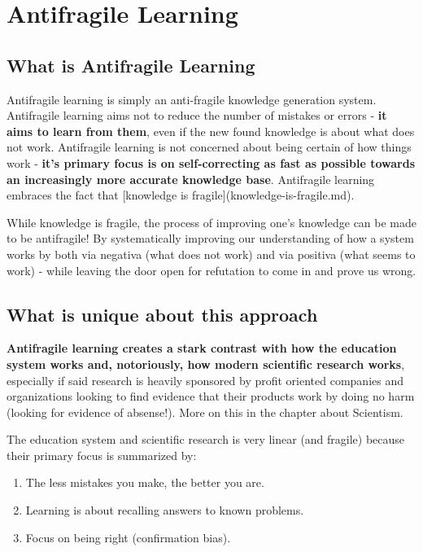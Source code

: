 \section{Antifragile Learning}

\subsection{What is Antifragile Learning}

Antifragile learning is simply an anti-fragile knowledge generation system. Antifragile learning aims not to reduce the number of mistakes or errors - \textbf{it aims to learn from them}, even if the new found knowledge is about what does not work. Antifragile learning is not concerned about being certain of how things work - \textbf{it's primary focus is on self-correcting as fast as possible towards an increasingly more accurate knowledge base}. Antifragile learning embraces the fact that [knowledge is fragile](knowledge-is-fragile.md).

While knowledge is fragile, the process of improving one's knowledge can be made to be antifragile! By systematically improving our understanding of how a system works by both via negativa (what does not work) and via positiva (what seems to work) - while leaving the door open for refutation to come in and prove us wrong.

\subsection{What is unique about this approach}

\textbf{Antifragile learning creates a stark contrast with how the education system works and, notoriously, how modern scientific research works}, especially if said research is heavily sponsored by profit oriented companies and organizations looking to find evidence that their products work by doing no harm (looking for evidence of absense!). More on this in the chapter about Scientism.

The education system and scientific research is very linear (and fragile) because their primary focus is summarized by:
\begin{enumerate}
	\item The less mistakes you make, the better you are.
	\item Learning is about recalling answers to known problems.
	\item Focus on being right (confirmation bias).
\end{enumerate}


